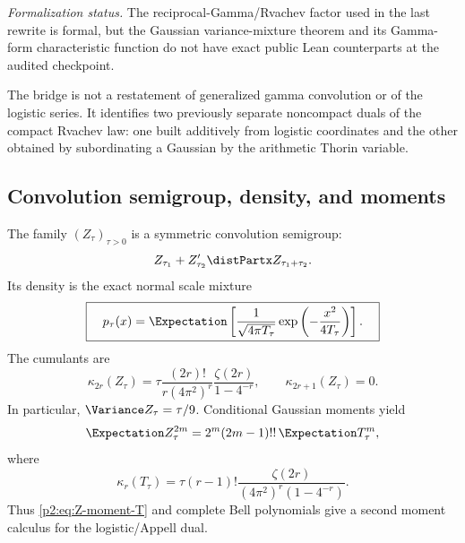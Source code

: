 \documentclass[11pt]{article}
\theoremstyle{definition}
\theoremstyle{remark}
\begin{document}
\emph{Formalization status.}  The reciprocal-Gamma/Rvachev factor used in the last rewrite is
formal, but the Gaussian variance-mixture theorem and its Gamma-form characteristic function
do not have exact public Lean counterparts at the audited checkpoint.

\begin{resultbox}
The bridge is not a restatement of generalized gamma convolution or of the logistic series.
It identifies two previously separate noncompact duals of the compact Rvachev law: one built
additively from logistic coordinates and the other obtained by subordinating a Gaussian by
the arithmetic Thorin variable.
\end{resultbox}

\subsection{Convolution semigroup, density, and moments}

The family $(Z_\tau)_{\tau>0}$ is a symmetric convolution semigroup:
\begin{equation}
 Z_{\tau_1}+Z'_{\tau_2}\distPartx Z_{\tau_1+\tau_2}.           \label{p2:eq:Z-semigroup}
\end{equation}
Its density is the exact normal scale mixture
\begin{equation}
 \boxed{\quad
 p_\tau(x)=\Expectation\left[
 \frac{1}{\sqrt{4\pi T_\tau}}
 \exp\left(-\frac{x^2}{4T_\tau}\right)
 \right].
 \quad}                                                  \label{p2:eq:Z-density-mixture}
\end{equation}
The cumulants are
\begin{equation}
 \kappa_{2r}(Z_\tau)
 =\tau\frac{(2r)!}{r(4\pi^2)^r}
 \frac{\zeta(2r)}{1-4^{-r}},
 \qquad \kappa_{2r+1}(Z_\tau)=0.                        \label{p2:eq:Z-cumulants}
\end{equation}
In particular, $\Variance Z_\tau=\tau/9$.  Conditional Gaussian moments yield
\begin{equation}
 \Expectation Z_\tau^{2m}=2^m(2m-1)!!\,\Expectation T_\tau^m,               \label{p2:eq:Z-moment-T}
\end{equation}
where
\begin{equation}
 \kappa_r(T_\tau)=
 \tau(r-1)!\frac{\zeta(2r)}{(4\pi^2)^r(1-4^{-r})}.       \label{p2:eq:T-cumulants}
\end{equation}
Thus \eqref{p2:eq:Z-moment-T} and complete Bell polynomials give a second moment calculus for
the logistic/Appell dual.
\end{document}

